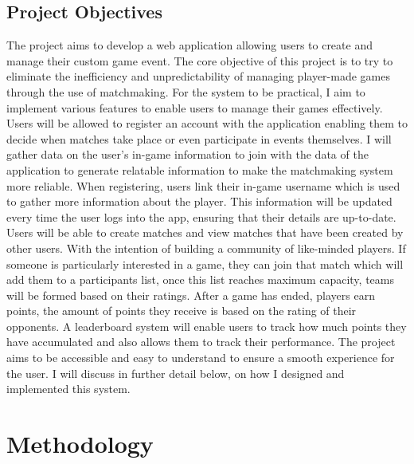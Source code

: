 \section{Project Objectives}
The project aims to develop a web application allowing users to create and manage their custom game event. The core objective of this project is to try to eliminate the inefficiency and unpredictability of managing player-made games through the use of matchmaking. For the system to be practical, I aim to implement various features to enable users to manage their games effectively.
Users will be allowed to register an account with the application enabling them to decide when matches take place or even participate in events themselves. \hfill \break
I will gather data on the user's in-game information to join with the data of the application to generate relatable information to make the matchmaking system more reliable. When registering, users link their in-game username which is used to gather more information about the player. This information will be updated every time the user logs into the app, ensuring that their details are up-to-date. \hfill \break
Users will be able to create matches and view matches that have been created by other users. With the intention of building a community of like-minded players. \hfill \break
If someone is particularly interested in a game, they can join that match which will add them to a participants list, once this list reaches maximum capacity, teams will be formed based on their ratings. \hfill \break
After a game has ended, players earn points, the amount of points they receive is based on the rating of their opponents. A leaderboard system will enable users to track how much points they have accumulated and also allows them to track their performance. \hfill \break
The project aims to be accessible and easy to understand to ensure a smooth experience for the user. I will discuss in further detail below, on how I designed and implemented this system.



\chapter{Methodology}
